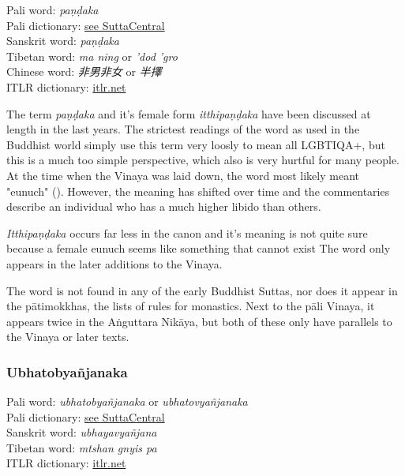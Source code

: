 Pali word: {\em paṇḍaka} \\
Pali dictionary: \href{https://suttacentral.net/define/pa%E1%B9%87%E1%B8%8Daka}{see SuttaCentral} \\
Sanskrit word: {\em paṇḍaka} \\
Tibetan word: {\em ma ning} or {\em ’dod ’gro} \\
Chinese word: {\em 非男非女} or {\em 半擇} \\
ITLR dictionary: \href{http://www.itlr.net/hwid:281142}{itlr.net} \\

\medskip

The term {\em paṇḍaka } and it's female form {\em itthipaṇḍaka } have been discussed at length in the last years. The strictest readings of the word as used in the Buddhist world simply use this term very loosly to mean all LGBTIQA+, but this is a much too simple perspective, which also is very hurtful for many people. At the time when the Vinaya was laid down, the word most likely meant "eunuch" (\cite{vimala}). However, the meaning has shifted over time and the commentaries describe an individual who has a much higher libido than others.

{\em Itthipaṇḍaka } occurs far less in the canon and it's meaning is not quite sure because a female eunuch seems like something that cannot exist The word only appears in the later additions to the Vinaya.

The word is not found in any of the early Buddhist Suttas, nor does it appear in the pātimokkhas, the lists of rules for monastics. Next to the pāli Vinaya, it appears twice in the Aṅguttara Nikāya, but both of these only have parallels to the Vinaya or later texts.


\subsubsection{Ubhatob­yañ­janaka}

Pali word: {\em ubhatob­yañ­janaka} or {\em ubhatovyañ­janaka} \\
Pali dictionary: \href{https://suttacentral.net/define/ubhatovya%C3%B1janaka}{see SuttaCentral} \\
Sanskrit word: {\em ubhayavyañjana} \\
Tibetan word: {\em mtshan gnyis pa} \\
ITLR dictionary: \href{http://www.itlr.net/hwid:62844}{itlr.net} \\

\medskip


